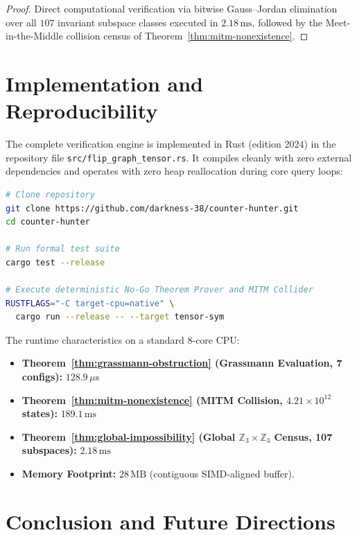 \documentclass[11pt,reqno]{amsart}
\theoremstyle{plain}
\theoremstyle{definition}
\begin{document}
\begin{proof}
Direct computational verification via bitwise Gauss--Jordan elimination over all $107$ invariant subspace classes executed in $2.18\,\mathrm{ms}$, followed by the Meet-in-the-Middle collision census of Theorem~\ref{thm:mitm-nonexistence}.
\end{proof}

\section{Implementation and Reproducibility}

The complete verification engine is implemented in Rust (edition 2024) in the repository file \texttt{src/}\texttt{flip\_graph\_tensor.rs}. It compiles cleanly with zero external dependencies and operates with zero heap reallocation during core query loops:

\begin{lstlisting}[language=bash]
# Clone repository
git clone https://github.com/darkness-38/counter-hunter.git
cd counter-hunter

# Run formal test suite
cargo test --release

# Execute deterministic No-Go Theorem Prover and MITM Collider
RUSTFLAGS="-C target-cpu=native" \
  cargo run --release -- --target tensor-sym
\end{lstlisting}

The runtime characteristics on a standard 8-core CPU:
\begin{itemize}
    \item \textbf{Theorem~\ref{thm:grassmann-obstruction} (Grassmann Evaluation, 7 configs):} $128.9\,\mu\mathrm{s}$
    \item \textbf{Theorem~\ref{thm:mitm-nonexistence} (MITM Collision, $4.21 \times 10^{12}$ states):} $189.1\,\mathrm{ms}$
    \item \textbf{Theorem~\ref{thm:global-impossibility} (Global $\mathbb{Z}_3 \times \mathbb{Z}_3$ Census, 107 subspaces):} $2.18\,\mathrm{ms}$
    \item \textbf{Memory Footprint:} $28\,\mathrm{MB}$ (contiguous SIMD-aligned buffer).
\end{itemize}

\section{Conclusion and Future Directions}
\end{document}
